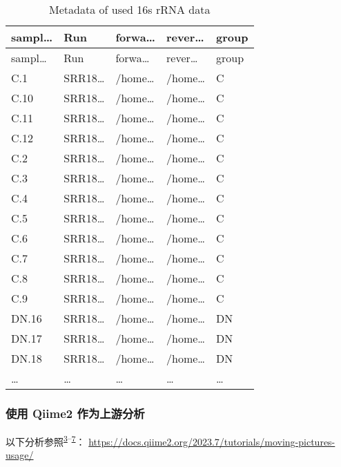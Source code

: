 \documentclass[
]{article}
\begin{document}
\begin{longtable}[]{@{}lllll@{}}
\caption{\label{tab:metadata-of-used-16s-rRNA-data}Metadata of used 16s rRNA data}\tabularnewline
\toprule\noalign{}
sampl\ldots{} & Run & forwa\ldots{} & rever\ldots{} & group \\
\midrule\noalign{}
\endfirsthead
\toprule\noalign{}
sampl\ldots{} & Run & forwa\ldots{} & rever\ldots{} & group \\
\midrule\noalign{}
\endhead
\bottomrule\noalign{}
\endlastfoot
C.1 & SRR18\ldots{} & /home\ldots{} & /home\ldots{} & C \\
C.10 & SRR18\ldots{} & /home\ldots{} & /home\ldots{} & C \\
C.11 & SRR18\ldots{} & /home\ldots{} & /home\ldots{} & C \\
C.12 & SRR18\ldots{} & /home\ldots{} & /home\ldots{} & C \\
C.2 & SRR18\ldots{} & /home\ldots{} & /home\ldots{} & C \\
C.3 & SRR18\ldots{} & /home\ldots{} & /home\ldots{} & C \\
C.4 & SRR18\ldots{} & /home\ldots{} & /home\ldots{} & C \\
C.5 & SRR18\ldots{} & /home\ldots{} & /home\ldots{} & C \\
C.6 & SRR18\ldots{} & /home\ldots{} & /home\ldots{} & C \\
C.7 & SRR18\ldots{} & /home\ldots{} & /home\ldots{} & C \\
C.8 & SRR18\ldots{} & /home\ldots{} & /home\ldots{} & C \\
C.9 & SRR18\ldots{} & /home\ldots{} & /home\ldots{} & C \\
DN.16 & SRR18\ldots{} & /home\ldots{} & /home\ldots{} & DN \\
DN.17 & SRR18\ldots{} & /home\ldots{} & /home\ldots{} & DN \\
DN.18 & SRR18\ldots{} & /home\ldots{} & /home\ldots{} & DN \\
\ldots{} & \ldots{} & \ldots{} & \ldots{} & \ldots{} \\
\end{longtable}

\hypertarget{ux4f7fux7528-qiime2-ux4f5cux4e3aux4e0aux6e38ux5206ux6790}{%
\subsubsection{使用 Qiime2 作为上游分析}\label{ux4f7fux7528-qiime2-ux4f5cux4e3aux4e0aux6e38ux5206ux6790}}

以下分析参照\textsuperscript{\protect\hyperlink{ref-ReproducibleIBolyen2019}{3}--\protect\hyperlink{ref-MicrobialCommuHamday2009}{7}}： \url{https://docs.qiime2.org/2023.7/tutorials/moving-pictures-usage/}
\end{document}

